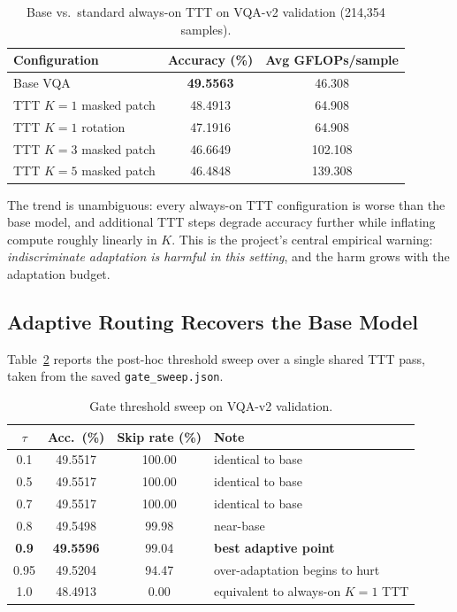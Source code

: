 \documentclass[conference]{IEEEtran}
\begin{document}
\begin{table}[!t]
\caption{Base vs.\ standard always-on TTT on VQA-v2 validation
(214{,}354 samples).}
\label{tab:base-vs-ttt}
\centering\footnotesize
\begin{tabular}{lcc}
\toprule
\textbf{Configuration} & \textbf{Accuracy (\%)} & \textbf{Avg GFLOPs/sample} \\
\midrule
Base VQA              & \textbf{49.5563} & 46.308  \\
TTT $K{=}1$ masked patch & 48.4913 & 64.908  \\
TTT $K{=}1$ rotation     & 47.1916 & 64.908  \\
TTT $K{=}3$ masked patch & 46.6649 & 102.108 \\
TTT $K{=}5$ masked patch & 46.4848 & 139.308 \\
\bottomrule
\end{tabular}
\end{table}

The trend is unambiguous: every always-on TTT configuration is worse
than the base model, and additional TTT steps degrade accuracy further
while inflating compute roughly linearly in $K$. This is the project's
central empirical warning: \emph{indiscriminate adaptation is harmful in
this setting}, and the harm grows with the adaptation budget.

\subsection{Adaptive Routing Recovers the Base Model}

Table~\ref{tab:gate-sweep} reports the post-hoc threshold sweep over a
single shared TTT pass, taken from the saved \texttt{gate\_sweep.json}.

\begin{table}[!t]
\caption{Gate threshold sweep on VQA-v2 validation.}
\label{tab:gate-sweep}
\centering\footnotesize
\begin{tabular}{cccl}
\toprule
$\tau$ & Acc.\ (\%) & Skip rate (\%) & Note \\
\midrule
0.1 & 49.5517 & 100.00 & identical to base \\
0.5 & 49.5517 & 100.00 & identical to base \\
0.7 & 49.5517 & 100.00 & identical to base \\
0.8 & 49.5498 & 99.98 & near-base \\
\textbf{0.9} & \textbf{49.5596} & 99.04 & \textbf{best adaptive point} \\
0.95 & 49.5204 & 94.47 & over-adaptation begins to hurt \\
1.0 & 48.4913 & 0.00 & equivalent to always-on $K{=}1$ TTT \\
\bottomrule
\end{tabular}
\end{table}
\end{document}

